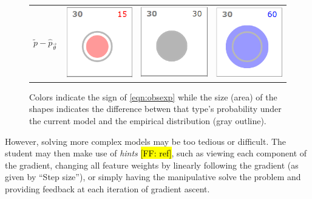 \documentclass[11pt,letterpaper]{article}
\newcommand{\Note}[1]{}
\renewcommand{\Note}[1]{\hl{[#1]}}
\newcommand{\NoteSigned}[3]{{\sethlcolor{#2}\Note{#1: #3}}}
\newcommand{\NoteFF}[1]{\NoteSigned{FF}{LightBlue}{#1}}
\newcommand{\empirical}[0]{\ensuremath{\tilde{p}}}
\begin{document}
\begin{figure}[t]
\begin{tabular}{
>{\centering\arraybackslash}m{} 
>{\centering\arraybackslash}m{}
>{\centering\arraybackslash}m{}
>{\centering\arraybackslash}m{}}
$\empirical{} - \hat{p}_{\vec{\theta}} $& \includegraphics[scale=.25]{images/goldilocks-circle-small.PNG}
& \includegraphics[scale=.25]{images/goldilocks-circle-justright.PNG}
& \includegraphics[scale=.25]{images/goldilocks-circle-large.PNG}\\
\end{tabular}

\caption{Colors indicate the sign of \eqref{eqn:obsexp} while the size (area) of 
the shapes indicates the difference betwen that type's probability under the 
current model and the empirical distribution (gray outline).}
\label{fig:colorsize_inventory}
\end{figure}

However, solving more complex models may be too tedious or difficult. 
The student may then make use of \textit{hints} \NoteFF{ref}, such as
viewing each component of the gradient, changing all feature weights by 
linearly following the gradient (as given by ``Step size''), or simply having
the manipulative solve the problem and providing feedback at each iteration 
of gradient ascent.
\end{document}
